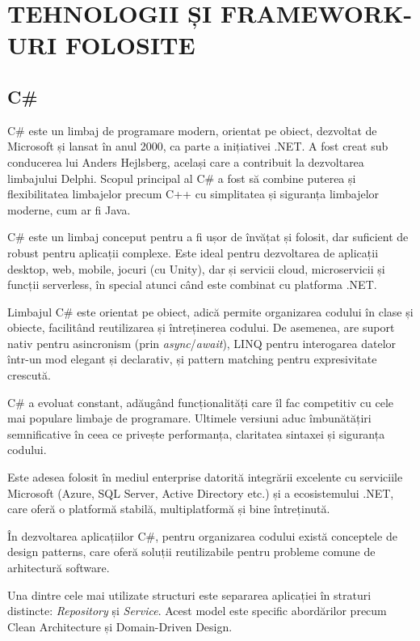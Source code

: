 \chapter{TEHNOLOGII ȘI FRAMEWORK-URI FOLOSITE}
\section{C\#}

C\# este un limbaj de programare modern, orientat pe obiect, dezvoltat de Microsoft și lansat în anul 2000, ca parte a inițiativei .NET. A fost creat sub conducerea lui Anders Hejlsberg, același care a contribuit la dezvoltarea limbajului Delphi. Scopul principal al C\# a fost să combine puterea și flexibilitatea limbajelor precum C++ cu simplitatea și siguranța limbajelor moderne, cum ar fi Java. \parencite{charp}

C\# este un limbaj conceput pentru a fi ușor de învățat și folosit, dar suficient de robust pentru aplicații complexe. Este ideal pentru dezvoltarea de aplicații desktop, web, mobile, jocuri (cu Unity), dar și servicii cloud, microservicii și funcții serverless, în special atunci când este combinat cu platforma .NET. \parencite{charp}

Limbajul C\# este orientat pe obiect, adică permite organizarea codului în clase și obiecte, facilitând reutilizarea și întreținerea codului. De asemenea, are suport nativ pentru asincronism (prin \textit{async}/\textit{await}), LINQ pentru interogarea datelor într-un mod elegant și declarativ, și pattern matching pentru expresivitate crescută. \parencite{charp}

C\# a evoluat constant, adăugând funcționalități care îl fac competitiv cu cele mai populare limbaje de programare. Ultimele versiuni aduc îmbunătățiri semnificative în ceea ce privește performanța, claritatea sintaxei și siguranța codului. \parencite{charp}

Este adesea folosit în mediul enterprise datorită integrării excelente cu serviciile Microsoft (Azure, SQL Server, Active Directory etc.) și a ecosistemului .NET, care oferă o platformă stabilă, multiplatformă și bine întreținută. \parencite{charp}

În dezvoltarea aplicațiilor C\#, pentru organizarea codului există conceptele de design patterns, care oferă soluții reutilizabile pentru probleme comune de arhitectură software. \parencite{charp}

Una dintre cele mai utilizate structuri este separarea aplicației în straturi distincte: \textit{Repository} și \textit{Service}. Acest model este specific abordărilor precum Clean Architecture și Domain-Driven Design. \parencite{designPatterns}

